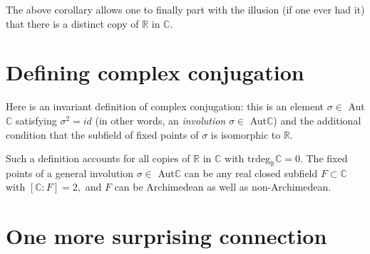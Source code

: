 \documentclass[11pt]{article}
\theoremstyle{plain}
\theoremstyle{definition}
\theoremstyle{remark}
\begin{document}
    The above corollary allows one to finally part with the illusion (if one ever had it) that there is a distinct copy of $\mathbb{R}$ in $\mathbb{C}$.

\section{Defining complex conjugation}

Here is an invariant definition of complex conjugation: this is an element $\sigma \in$ Aut$\mathbb{C}$ satisfying $\sigma^2 = id$ (in other words, an \textit{involution} $\sigma \in$ Aut$\mathbb{C}$) and the additional condition that the subfield of fixed points of $\sigma$ is isomorphic to $\mathbb{R}$.
\par
Such a definition accounts for all copies of $\mathbb{R}$ in $\mathbb{C}$ with $\textrm{trdeg}_\mathbb{R} \mathbb{C} = 0$. The fixed points of a general involution $\sigma \in$ Aut$\mathbb{C}$ can be any real closed subfield $F \subset \mathbb{C}$ with $[\mathbb{C} : F] =2,$ and $F$ can be Archimedean as well as non-Archimedean.

\section{One more surprising connection}
\end{document}
